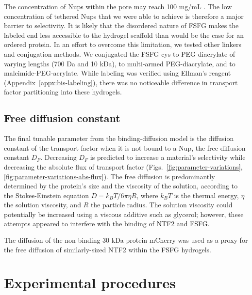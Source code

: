 The concentration of Nups within the pore may reach 100 mg/mL \cite{thing}.  The low concentration of tethered Nups that we were able to achieve is therefore a major barrier to selectivity.  It is likely that the disordered nature of FSFG makes the labeled end less accessible to the hydrogel scaffold than would be the case for an ordered protein.  In an effort to overcome this limitation, we tested other linkers and conjugation methods.  We conjugated the FSFG-cys to PEG-diacrylate of varying lengths (700 Da and 10 kDa), to multi-armed PEG-diacrylate, and to maleimide-PEG-acrylate.  While labeling was verified using Ellman's reagent (Appendix~\ref{appx:bis-labeling}), there was no noticeable difference in transport factor partitioning into these hydrogels.

\subsection{Free diffusion constant}

The final tunable parameter from the binding-diffusion model is the diffusion constant of the transport factor when it is not bound to a Nup, the free diffusion constant $D_F$.  Decreasing $D_F$ is predicted to increase a material's selectivity while decreasing the absolute flux of transport factor (Figs.~\ref{fig:parameter-variations}, \ref{fig:parameter-variations-abs-flux}).  The free diffusion is predominantly determined by the protein's size and the viscosity of the solution, according to the Stokes-Einstein equation $D = k_BT/6\pi\eta R$, where $k_BT$ is the thermal energy, $\eta$ the solution viscosity, and $R$ the particle radius.  The solution viscosity could potentially be increased using a viscous additive such as glycerol; however, these attempts appeared to interfere with the binding of NTF2 and FSFG.

The diffusion of the non-binding 30 kDa protein mCherry was used as a proxy for the free diffusion of similarly-sized NTF2 within the FSFG hydrogels.

\section{Experimental procedures}
